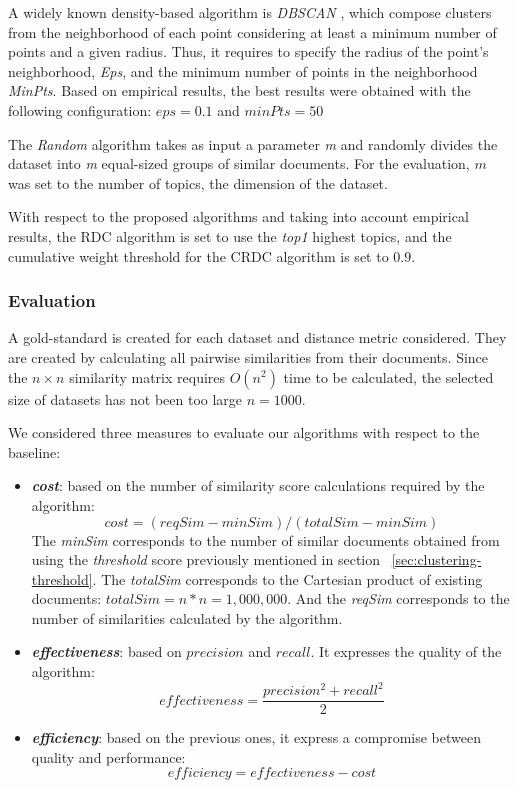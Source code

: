 A widely known density-based algorithm is \textit{DBSCAN} \citep{Ester1996}, which compose clusters from the neighborhood of each point considering at least a minimum number of points and a given radius. Thus, it requires to specify the radius of the point's neighborhood, \textit{Eps}, and the minimum number of points in the neighborhood \textit{MinPts}. Based on empirical results, the best results were obtained with the following configuration: $eps=0.1$ and $minPts=50$

The \textit{Random} algorithm takes as input a parameter \textit{m} and randomly divides the dataset into \textit{m} equal-sized groups of similar documents. For the evaluation, $m$ was set to the number of topics, the dimension of the dataset.

With respect to the proposed algorithms and taking into account empirical results, the RDC algorithm is set to use the \textit{top1} highest topics, and the cumulative weight threshold for the CRDC algorithm is set to $0.9$.

\subsubsection{Evaluation}

A gold-standard is created for each dataset and distance metric considered. They are created by calculating all pairwise similarities from their documents. Since the $n \times n$ similarity matrix requires $O(n^2)$ time to be calculated, the selected size of datasets has not been too large $n=1000$.

We considered three measures to evaluate our algorithms with respect to the baseline:
\begin{itemize}
  \item \textbf{\textit{cost}}: based on the number of similarity score calculations required by the algorithm:
\begin{equation}
cost=(reqSim - minSim)/(totalSim - minSim)
\end{equation}
The \textit{minSim} corresponds to the number of similar documents obtained from using the \textit{threshold} score previously mentioned in section ~\ref{sec:clustering-threshold}. The \textit{totalSim} corresponds to the Cartesian product of existing documents: $totalSim=n*n=1,000,000$. And the \textit{reqSim} corresponds to the number of similarities calculated by the algorithm.
  \item \textbf{\textit{effectiveness}}: based on $precision$ and $recall$. It expresses the quality of the algorithm:
\begin{equation}
 effectiveness = \frac{precision^2  + recall^2}{2}
\end{equation}
  \item \textbf{\textit{efficiency}}: based on the previous ones, it express a compromise between quality and performance:
\begin{equation}
 efficiency = effectiveness - cost
\end{equation}
\end{itemize}

